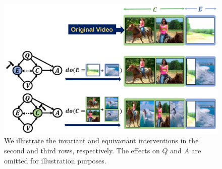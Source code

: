 




\begin{figure}[t]
\centering
\includegraphics[scale=0.43]{fig/intervene.pdf}
\caption{We illustrate the invariant and equivariant interventions in the second and third rows, respectively. The effects on $Q$ and $A$ are omitted for illustration purposes.}
\vspace{-5pt}
\label{fig:intervene}
\end{figure}